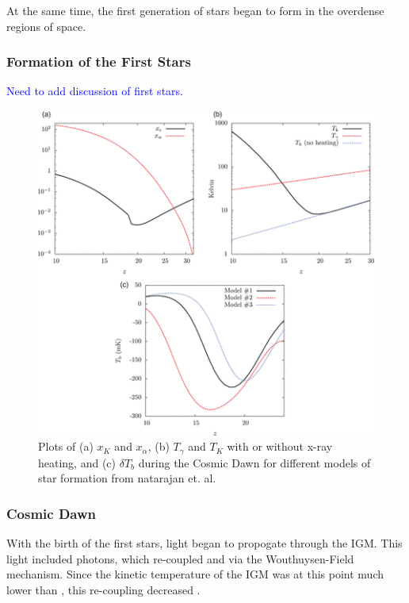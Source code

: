 At the same time, the first generation of stars began to form in the overdense regions of space. 

\subsubsection{Formation of the First Stars}

\textcolor{blue}{Need to add discussion of first stars.}

\begin{figure}[htb]
\begin{center}
\includegraphics[width=0.95\linewidth]{Introduction/figures/ts_evolution.png}
\caption{Plots of (a) $x_K$ and $x_{\alpha}$, (b) $T_\gamma$ and $T_K$ with or without x-ray heating, and (c) $\delta T_b$ during the Cosmic Dawn for different models of star formation from natarajan et. al. \cite{natarajan_2014}}
\label{Fig:cd_global}
\end{center}
\end{figure}

\subsubsection{Cosmic Dawn}
With the birth of the first stars, light began to propogate through the IGM. This light included \lya photons, which re-coupled \ts and \tk via the Wouthuysen-Field mechanism. Since the kinetic temperature of the IGM was at this point much lower than \tg, this re-coupling decreased \ts. 

